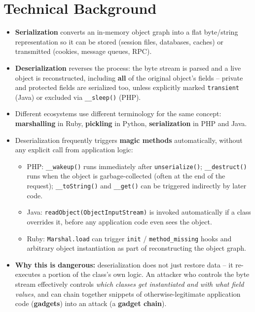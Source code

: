 \documentclass[11pt]{article}
\begin{document}
\section{Technical Background}
\begin{itemize}
    \item \textbf{Serialization} converts an in-memory object graph into a flat byte/string representation so it can be stored (session files, databases, caches) or transmitted (cookies, message queues, RPC).
    \item \textbf{Deserialization} reverses the process: the byte stream is parsed and a live object is reconstructed, including \textbf{all} of the original object's fields -- private and protected fields are serialized too, unless explicitly marked \texttt{transient} (Java) or excluded via \verb|__sleep()| (PHP).
    \item Different ecosystems use different terminology for the same concept: \textbf{marshalling} in Ruby, \textbf{pickling} in Python, \textbf{serialization} in PHP and Java.
    \item Deserialization frequently triggers \textbf{magic methods} automatically, without any explicit call from application logic:
    \begin{itemize}
        \item PHP: \verb|__wakeup()| runs immediately after \verb|unserialize()|; \verb|__destruct()| runs when the object is garbage-collected (often at the end of the request); \verb|__toString()| and \verb|__get()| can be triggered indirectly by later code.
        \item Java: \texttt{readObject(ObjectInputStream)} is invoked automatically if a class overrides it, before any application code even sees the object.
        \item Ruby: \texttt{Marshal.load} can trigger \texttt{init} / \texttt{method\_missing} hooks and arbitrary object instantiation as part of reconstructing the object graph.
    \end{itemize}
    \item \textbf{Why this is dangerous:} deserialization does not just restore data -- it re-executes a portion of the class's own logic. An attacker who controls the byte stream effectively controls \textit{which classes get instantiated and with what field values}, and can chain together snippets of otherwise-legitimate application code (\textbf{gadgets}) into an attack (a \textbf{gadget chain}).
\end{itemize}
\end{document}
